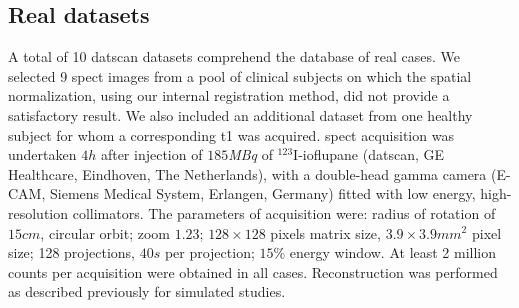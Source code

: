 \documentclass{frontiers}
\newcommand{\cbstart}{\relax}
\newcommand{\cbend}{\relax}
\begin{document}
\subsection{Real datasets} %
\label{sec:data_real}
\cbstart
A total of 10 \gls*{datscan} datasets comprehend the database of real cases.
We selected 9 \gls*{spect} images from a pool of clinical subjects on which
  the spatial normalization, using our internal registration method, did not
  provide a satisfactory result.
We also included an additional dataset from one healthy subject for whom
  a corresponding \gls*{t1} was acquired.
\cbend
\Gls*{spect} acquisition was undertaken $4h$
  after injection  of $185$\textit{MBq} of $^{123}$I-ioflupane
  (\Gls*{datscan}, GE Healthcare, Eindhoven, The Netherlands),
  with a  double-head gamma camera (E-CAM, Siemens Medical System,
  Erlangen, Germany) fitted with low energy, high-resolution collimators.
The parameters of acquisition were: radius of rotation of $15cm$,
  circular orbit; zoom $1.23$; $128\times128$
  pixels matrix size, $3.9\times3.9mm^{2}$ pixel size;
  128 projections, $40s$ per projection; 
  $15\%$ energy window.
At least 2 million counts per acquisition were obtained in all cases.
Reconstruction was performed as described previously for simulated studies.
\end{document}
